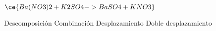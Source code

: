 $\ce{Ba(NO3)2 +K2SO4 -> BaSO4 + KNO3}$

\begin{choices}
    \choice Descomposición
    \choice Combinación
    \choice Desplazamiento
    \CorrectChoice Doble desplazamiento
\end{choices}